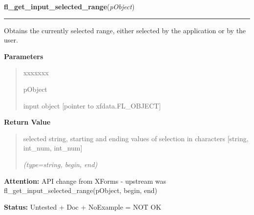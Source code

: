 \hspace{.8\funcindent}\begin{boxedminipage}{\funcwidth}

    \raggedright \textbf{fl\_get\_input\_selected\_range}(\textit{pObject})

    \vspace{-1.5ex}

    \rule{\textwidth}{0.5\fboxrule}
\setlength{\parskip}{2ex}
    Obtains the currently selected range, either selected by the 
    application or by the user.

\setlength{\parskip}{1ex}
      \textbf{Parameters}
      \vspace{-1ex}

      \begin{quote}
        \begin{Ventry}{xxxxxxx}

          \item[pObject]

          input object [pointer to xfdata.FL\_OBJECT]

        \end{Ventry}

      \end{quote}

      \textbf{Return Value}
    \vspace{-1ex}

      \begin{quote}
      selected string, starting and ending values of selection in 
      characters [string, int\_num, int\_num]

      {\it (type=string, begin, end)}

      \end{quote}

\textbf{Attention:} API change from XForms - upstream was 
fl\_get\_input\_selected\_range(pObject, begin, end)



\textbf{Status:} Untested + Doc + NoExample = NOT OK



    \end{boxedminipage}

    \label{xformslib:library:fl_set_input_maxchars}

    \vspace{0.5ex}

